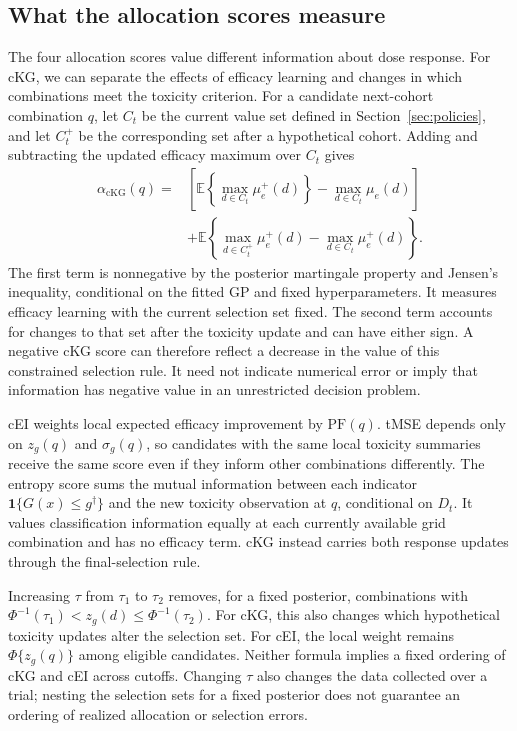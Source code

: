 \documentclass[11pt]{article}
\newcommand{\rev}[1]{{#1}}
\newcommand{\PF}{\mathrm{PF}}
\begin{document}
\subsection{\rev{What the allocation scores measure}}\label{sec:theory}

\rev{The four allocation scores value different information about dose response. For cKG, we can separate the effects of efficacy learning and changes in which combinations meet the toxicity criterion.} For a candidate next-cohort combination $q$, let $C_t$ be the current value set defined in Section~\ref{sec:policies}, and let $C_t^+$ be the corresponding set after a hypothetical cohort. Adding and subtracting the updated efficacy maximum over $C_t$ gives
\begin{align}\label{eq:decomp_main}
\alpha_{\mathrm{cKG}}(q)
={}&\left[\mathbb E\!\left\{\max_{d\in C_t}\mu_e^+(d)\right\}-\max_{d\in C_t}\mu_e(d)\right] \\
&+\mathbb E\!\left\{\max_{d\in C_t^+}\mu_e^+(d)-\max_{d\in C_t}\mu_e^+(d)\right\}.
\end{align}
The first term is nonnegative by the posterior martingale property and Jensen's inequality, conditional on the fitted GP and fixed hyperparameters. \rev{It measures efficacy learning with the current selection set fixed.} The second term accounts for changes to that set after the toxicity update and can have either sign. \rev{A negative cKG score can therefore reflect a decrease in the value of this constrained selection rule. It need not indicate numerical error or imply that information has negative value in an unrestricted decision problem.}

cEI weights local expected efficacy improvement by $\PF(q)$. tMSE depends only on $z_g(q)$ and $\sigma_g(q)$, so candidates with the same local toxicity summaries receive the same score even if they inform other combinations differently. The entropy score sums the mutual information between each indicator $\mathbf 1\{G(x)\le g^\dagger\}$ and the new toxicity observation at $q$, conditional on $D_t$. \rev{It values classification information equally at each currently available grid combination and has no efficacy term.} cKG instead carries both response updates through the final-selection rule.

Increasing $\tau$ from $\tau_1$ to $\tau_2$ removes, for a fixed posterior, combinations with $\Phi^{-1}(\tau_1)<z_g(d)\le\Phi^{-1}(\tau_2)$. For cKG, this also changes which hypothetical toxicity updates alter the selection set. For cEI, the local weight remains $\Phi\{z_g(q)\}$ among eligible candidates. Neither formula implies a fixed ordering of cKG and cEI across cutoffs. \rev{Changing $\tau$ also changes the data collected over a trial; nesting the selection sets for a fixed posterior does not guarantee an ordering of realized allocation or selection errors.}
\end{document}
